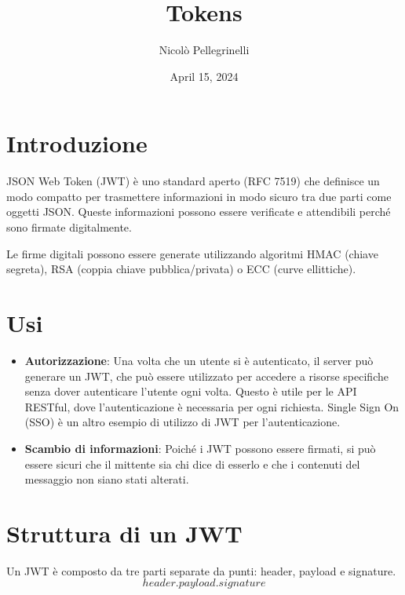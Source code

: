 \documentclass{article}
\title{Tokens}
\author{Nicolò Pellegrinelli}
\date{April 15, 2024}
\begin{document}
\sloppy

\maketitle




\section{Introduzione}
JSON Web Token (JWT) è uno standard aperto (RFC 7519) che definisce un modo compatto per trasmettere informazioni in modo sicuro tra due parti come oggetti JSON.
Queste informazioni possono essere verificate e attendibili perché sono firmate digitalmente.

Le firme digitali possono essere generate utilizzando algoritmi HMAC (chiave segreta), RSA (coppia chiave pubblica/privata) o ECC (curve ellittiche).

\section{Usi}
\begin{itemize}
	\item \textbf{Autorizzazione}: Una volta che un utente si è autenticato, il server può generare un JWT, che può essere utilizzato per accedere a risorse specifiche senza dover autenticare l'utente ogni volta.
	      Questo è utile per le API RESTful, dove l'autenticazione è necessaria per ogni richiesta.
	      Single Sign On (SSO) è un altro esempio di utilizzo di JWT per l'autenticazione.
	\item \textbf{Scambio di informazioni}: Poiché i JWT possono essere firmati, si può essere sicuri che il mittente sia chi dice di esserlo e che i contenuti del messaggio non siano stati alterati.
\end{itemize}

\section{Struttura di un JWT}
Un JWT è composto da tre parti separate da punti: header, payload e signature.
$$header.payload.signature$$
\end{document}
